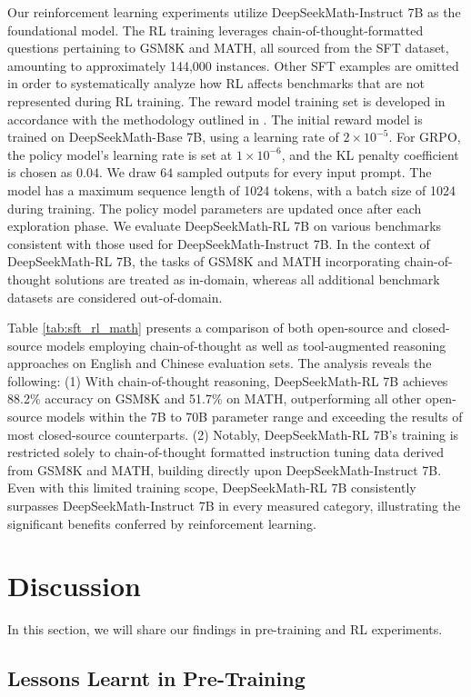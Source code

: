 \begin{itemize}[topsep=0pt]
\begin{itemize}[topsep=0pt]
Our reinforcement learning experiments utilize DeepSeekMath-Instruct 7B as the foundational model. The RL training leverages chain-of-thought-formatted questions pertaining to GSM8K and MATH, all sourced from the SFT dataset, amounting to approximately 144,000 instances. Other SFT examples are omitted in order to systematically analyze how RL affects benchmarks that are not represented during RL training. The reward model training set is developed in accordance with the methodology outlined in \citep{wang2023math}. The initial reward model is trained on DeepSeekMath-Base 7B, using a learning rate of $2 \times 10^{-5}$. For GRPO, the policy model's learning rate is set at $1 \times 10^{-6}$, and the KL penalty coefficient is chosen as $0.04$. We draw $64$ sampled outputs for every input prompt. The model has a maximum sequence length of 1024 tokens, with a batch size of 1024 during training. The policy model parameters are updated once after each exploration phase. We evaluate DeepSeekMath-RL 7B on various benchmarks consistent with those used for DeepSeekMath-Instruct 7B. In the context of DeepSeekMath-RL 7B, the tasks of GSM8K and MATH incorporating chain-of-thought solutions are treated as in-domain, whereas all additional benchmark datasets are considered out-of-domain.

Table \ref{tab:sft_rl_math} presents a comparison of both open-source and closed-source models employing chain-of-thought as well as tool-augmented reasoning approaches on English and Chinese evaluation sets. The analysis reveals the following: (1) With chain-of-thought reasoning, DeepSeekMath-RL 7B achieves 88.2\% accuracy on GSM8K and 51.7\% on MATH, outperforming all other open-source models within the 7B to 70B parameter range and exceeding the results of most closed-source counterparts. (2) Notably, DeepSeekMath-RL 7B’s training is restricted solely to chain-of-thought formatted instruction tuning data derived from GSM8K and MATH, building directly upon DeepSeekMath-Instruct 7B. Even with this limited training scope, DeepSeekMath-RL 7B consistently surpasses DeepSeekMath-Instruct 7B in every measured category, illustrating the significant benefits conferred by reinforcement learning.

\section{Discussion}
In this section, we will share our findings in pre-training and RL experiments. 

\subsection{Lessons Learnt in Pre-Training}


\end{itemize}
\end{itemize}
